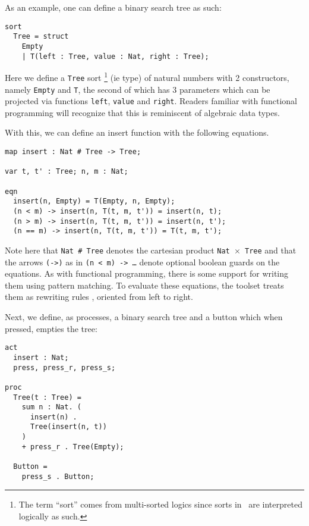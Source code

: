 \documentclass{article}
\begin{document}
As an example, one can define a binary search tree as such:
\begin{verbatim}
sort
  Tree = struct
    Empty
    | T(left : Tree, value : Nat, right : Tree);
\end{verbatim}
Here we define a \texttt{Tree} sort
\footnote{
  The term ``sort'' comes from multi-sorted logics since sorts in \mcrl \,
  are interpreted logically as such. 
}
(ie type) of natural numbers with 2
constructors, namely \texttt{Empty} and \texttt{T}, the second of which has 3
parameters which can be projected via functions \texttt{left}, \texttt{value}
and \texttt{right}.
Readers familiar with functional programming will recognize that this is
reminiscent of algebraic data types.

With this, we can define an insert function with the following equations.

\begin{verbatim}
map insert : Nat # Tree -> Tree;

var t, t' : Tree; n, m : Nat;

eqn
  insert(n, Empty) = T(Empty, n, Empty);
  (n < m) -> insert(n, T(t, m, t')) = insert(n, t);
  (n > m) -> insert(n, T(t, m, t')) = insert(n, t');
  (n == m) -> insert(n, T(t, m, t')) = T(t, m, t');
\end{verbatim}

Note here that \texttt{Nat \# Tree} denotes the cartesian product
\texttt{Nat $\times$ Tree} and that the arrows \texttt{(->)} as in
\texttt{(n < m) -> \dots} denote optional boolean guards on the equations.
As with functional programming, there is some support for writing them using
pattern matching.
To evaluate these equations, the toolset treats them as rewriting rules
\cite{mcrl_rewriting}, oriented from left to right.

Next, we define, as processes, a binary search tree and a button which
when pressed, empties the tree:

\begin{verbatim}
act
  insert : Nat;
  press, press_r, press_s;

proc
  Tree(t : Tree) =
    sum n : Nat. (
      insert(n) .
      Tree(insert(n, t))
    )
    + press_r . Tree(Empty);

  Button =
    press_s . Button;
\end{verbatim}
\end{document}
